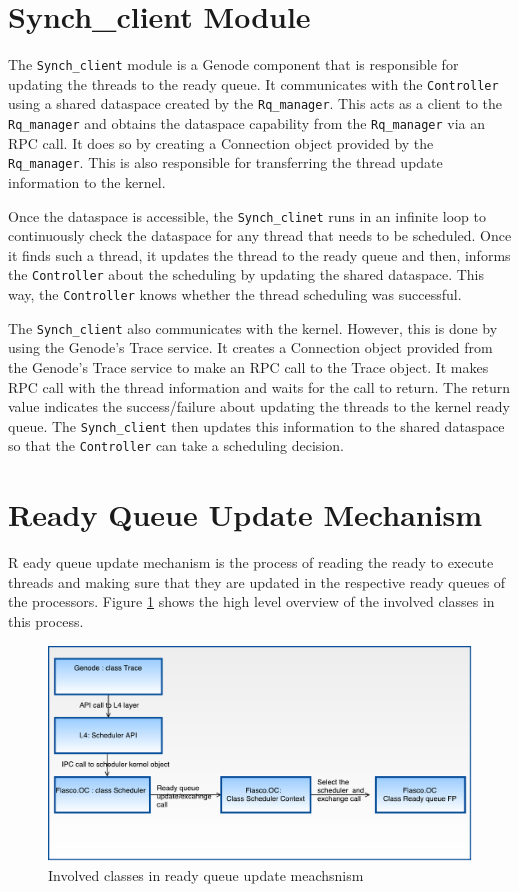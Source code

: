 \section{Synch\_client Module}
The \texttt{Synch\_client} module is a Genode component that is responsible for updating the threads to the ready queue. It communicates with the \texttt{Controller} using a shared dataspace created by the \texttt{Rq\_manager}. This acts as a client to the \texttt{Rq\_manager} and obtains the dataspace capability from the \texttt{Rq\_manager} via an RPC call. It does so by creating a Connection object provided by the \texttt{Rq\_manager}. This is also responsible for transferring the thread update information to the kernel.

Once the dataspace is accessible, the \texttt{Synch\_clinet} runs in an infinite loop to continuously check the dataspace for any thread that needs to be scheduled. Once it finds such a thread, it updates the thread to the ready queue and then, informs the \texttt{Controller} about the scheduling by updating the shared dataspace. This way, the \texttt{Controller} knows whether the thread scheduling was successful.

The \texttt{Synch\_client} also communicates with the kernel. However, this is done by using the Genode's Trace service. It creates a Connection object provided from the Genode's Trace service to make an RPC call to the Trace object. It makes RPC call with the thread information and waits for the call to return. The return value indicates the success/failure about updating the threads to the kernel ready queue. The \texttt{Synch\_client} then updates this information to the shared dataspace so that the \texttt{Controller} can take a scheduling decision.

\section{Ready Queue Update Mechanism} \label{design:rqupdate}

R	eady queue update mechanism is the process of reading the ready to execute threads and making sure that they are updated in the respective ready queues of the processors. Figure \ref{fig:class_rqupdate} shows the high level overview of the involved classes in this process.

\begin{figure}[h]
\centering
\includegraphics[width=0.9\linewidth]{figures/class_rqupdate1}
\caption{Involved classes in ready queue update meachsnism}
\label{fig:class_rqupdate}
\end{figure}


